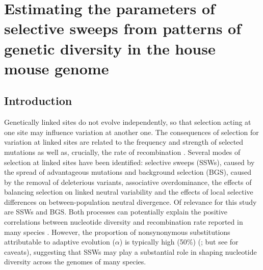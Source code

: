 

\chapter{Estimating the parameters of selective sweeps from patterns of genetic diversity in the house mouse genome}





%
%


\section{Introduction}

	Genetically linked sites do not evolve independently, so that selection acting at one site may influence variation at another one. The consequences of selection for variation at linked sites are related to the frequency and strength of selected mutations as well as, crucially, the rate of recombination \citep{RN124,RN287,RN206,RN157}. Several modes of selection at linked sites have been identified: selective sweeps (SSWs), caused by the spread of advantageous mutations and background selection (BGS), caused by the removal of deleterious variants, associative overdominance, the effects of balancing selection on linked neutral variability and the effects of local selective differences on between-population neutral divergence.	 Of relevance for this study are SSWs and BGS. Both processes can potentially explain the positive correlations between nucleotide diversity and recombination rate reported in many species \citep{RN117}. However, the proportion of nonsynonymous substitutions attributable to adaptive evolution ($\alpha$) is typically high (50\%) (\citealt{RN215}; but see \citealt{RN352} for caveats), suggesting that SSWs may play a substantial role in shaping nucleotide diversity across the genomes of many species.

